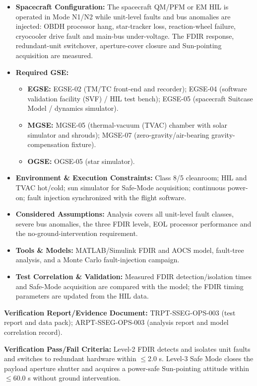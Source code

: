 \begin{itemize}
\item \textbf{Spacecraft Configuration:} The spacecraft QM/PFM or EM HIL is operated in Mode N1/N2 while unit-level faults and bus anomalies are injected: OBDH processor hang, star-tracker loss, reaction-wheel failure, cryocooler drive fault and main-bus under-voltage. The FDIR response, redundant-unit switchover, aperture-cover closure and Sun-pointing acquisition are measured.
\item \textbf{Required GSE:}
\begin{itemize}
\item \textbf{EGSE:} EGSE-02 (TM/TC front-end and recorder); EGSE-04 (software validation facility (SVF) / HIL test bench); EGSE-05 (spacecraft Suitcase Model / dynamics simulator).
\item \textbf{MGSE:} MGSE-05 (thermal-vacuum (TVAC) chamber with solar simulator and shrouds); MGSE-07 (zero-gravity/air-bearing gravity-compensation fixture).
\item \textbf{OGSE:} OGSE-05 (star simulator).
\end{itemize}
\item \textbf{Environment \& Execution Constraints:} Class 8/5 cleanroom; HIL and TVAC hot/cold; sun simulator for Safe-Mode acquisition; continuous power-on; fault injection synchronized with the flight software.
\item \textbf{Considered Assumptions:} Analysis covers all unit-level fault classes, severe bus anomalies, the three FDIR levels, EOL processor performance and the no-ground-intervention requirement.
\item \textbf{Tools \& Models:} MATLAB/Simulink FDIR and AOCS model, fault-tree analysis, and a Monte Carlo fault-injection campaign.
\item \textbf{Test Correlation \& Validation:} Measured FDIR detection/isolation times and Safe-Mode acquisition are compared with the model; the FDIR timing parameters are updated from the HIL data.
\end{itemize}
\par\textbf{Verification Report/Evidence Document:} TRPT-SSEG-OPS-003 (test report and data pack); ARPT-SSEG-OPS-003 (analysis report and model correlation record).
\par\textbf{Verification Pass/Fail Criteria:} Level-2 FDIR detects and isolates unit faults and switches to redundant hardware within $\le$2.0 s. Level-3 Safe Mode closes the payload aperture shutter and acquires a power-safe Sun-pointing attitude within $\le$60.0 s without ground intervention.
\par\medskip
